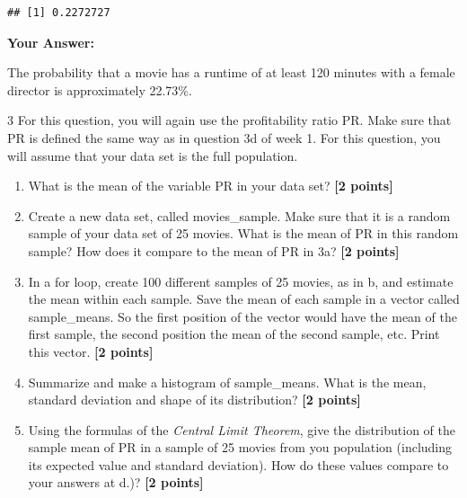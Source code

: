 \documentclass[
]{article}
\newenvironment{Shaded}{\begin{snugshade}}{\end{snugshade}}
\newcommand{\AttributeTok}[1]{\textcolor[rgb]{0.13,0.29,0.53}{#1}}
\newcommand{\ConstantTok}[1]{\textcolor[rgb]{0.56,0.35,0.01}{#1}}
\newcommand{\DecValTok}[1]{\textcolor[rgb]{0.00,0.00,0.81}{#1}}
\newcommand{\FunctionTok}[1]{\textcolor[rgb]{0.13,0.29,0.53}{\textbf{#1}}}
\newcommand{\NormalTok}[1]{#1}
\newcommand{\SpecialCharTok}[1]{\textcolor[rgb]{0.81,0.36,0.00}{\textbf{#1}}}
\newcommand{\StringTok}[1]{\textcolor[rgb]{0.31,0.60,0.02}{#1}}
\providecommand{\tightlist}{%
  \setlength{\itemsep}{0pt}\setlength{\parskip}{0pt}}
\begin{document}
\begin{Shaded}
\end{Shaded}

\begin{verbatim}
## [1] 0.2272727
\end{verbatim}

\textbf{Your Answer:}

The probability that a movie has a runtime of at least 120 minutes with
a female director is approximately 22.73\%.

3 For this question, you will again use the profitability ratio PR. Make
sure that PR is defined the same way as in question 3d of week 1. For
this question, you will assume that your data set is the full
population.

\begin{enumerate}
\def\labelenumi{\alph{enumi}.}
\tightlist
\item
  What is the mean of the variable PR in your data set?
  \textbf{[2 points]}
\item
  Create a new data set, called movies\_sample. Make sure that it is a
  random sample of your data set of 25 movies. What is the mean of PR in
  this random sample? How does it compare to the mean of PR in 3a?
  \textbf{[2 points]}
\item
  In a for loop, create 100 different samples of 25 movies, as in b, and
  estimate the mean within each sample. Save the mean of each sample in
  a vector called sample\_means. So the first position of the vector
  would have the mean of the first sample, the second position the mean
  of the second sample, etc. Print this vector. \textbf{[2 points]}
\item
  Summarize and make a histogram of sample\_means. What is the mean,
  standard deviation and shape of its distribution? \textbf{[2 points]}
\item
  Using the formulas of the \emph{Central Limit Theorem}, give the
  distribution of the sample mean of PR in a sample of 25 movies from
  you population (including its expected value and standard deviation).
  How do these values compare to your answers at d.)?
  \textbf{[2 points]}
\end{enumerate}
\end{document}
